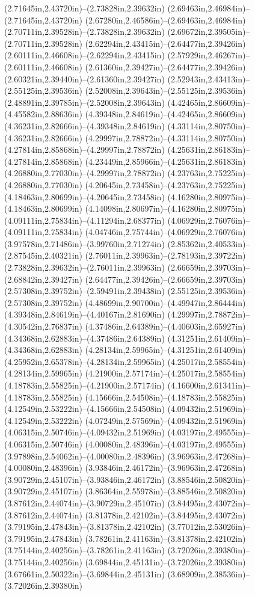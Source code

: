 (2.71645in,2.43720in)--(2.73828in,2.39632in) (2.69463in,2.46984in)--(2.71645in,2.43720in) (2.67280in,2.46586in)--(2.69463in,2.46984in) (2.70711in,2.39528in)--(2.73828in,2.39632in) (2.69672in,2.39505in)--(2.70711in,2.39528in) (2.62294in,2.43415in)--(2.64477in,2.39426in) (2.60111in,2.46608in)--(2.62294in,2.43415in) (2.57929in,2.46267in)--(2.60111in,2.46608in) (2.61360in,2.39427in)--(2.64477in,2.39426in) (2.60321in,2.39440in)--(2.61360in,2.39427in) (2.52943in,2.43413in)--(2.55125in,2.39536in) (2.52008in,2.39643in)--(2.55125in,2.39536in) (2.48891in,2.39785in)--(2.52008in,2.39643in) (4.42465in,2.86609in)--(4.45582in,2.88636in) (4.39348in,2.84619in)--(4.42465in,2.86609in) (4.36231in,2.82666in)--(4.39348in,2.84619in) (4.33114in,2.80750in)--(4.36231in,2.82666in) (4.29997in,2.78872in)--(4.33114in,2.80750in) (4.27814in,2.85868in)--(4.29997in,2.78872in) (4.25631in,2.86183in)--(4.27814in,2.85868in) (4.23449in,2.85966in)--(4.25631in,2.86183in) (4.26880in,2.77030in)--(4.29997in,2.78872in) (4.23763in,2.75225in)--(4.26880in,2.77030in) (4.20645in,2.73458in)--(4.23763in,2.75225in) (4.18463in,2.80699in)--(4.20645in,2.73458in) (4.16280in,2.80975in)--(4.18463in,2.80699in) (4.14098in,2.80697in)--(4.16280in,2.80975in) (4.09111in,2.75834in)--(4.11294in,2.68377in) (4.06929in,2.76076in)--(4.09111in,2.75834in) (4.04746in,2.75744in)--(4.06929in,2.76076in) (3.97578in,2.71486in)--(3.99760in,2.71274in) (2.85362in,2.40533in)--(2.87545in,2.40321in) (2.76011in,2.39963in)--(2.78193in,2.39722in) (2.73828in,2.39632in)--(2.76011in,2.39963in) (2.66659in,2.39703in)--(2.68842in,2.39427in) (2.64477in,2.39426in)--(2.66659in,2.39703in) (2.57308in,2.39752in)--(2.59491in,2.39438in) (2.55125in,2.39536in)--(2.57308in,2.39752in) (4.48699in,2.90700in)--(4.49947in,2.86444in) (4.39348in,2.84619in)--(4.40167in,2.81690in) (4.29997in,2.78872in)--(4.30542in,2.76837in) (4.37486in,2.64389in)--(4.40603in,2.65927in) (4.34368in,2.62883in)--(4.37486in,2.64389in) (4.31251in,2.61409in)--(4.34368in,2.62883in) (4.28134in,2.59965in)--(4.31251in,2.61409in) (4.25952in,2.65378in)--(4.28134in,2.59965in) (4.25017in,2.58554in)--(4.28134in,2.59965in) (4.21900in,2.57174in)--(4.25017in,2.58554in) (4.18783in,2.55825in)--(4.21900in,2.57174in) (4.16600in,2.61341in)--(4.18783in,2.55825in) (4.15666in,2.54508in)--(4.18783in,2.55825in) (4.12549in,2.53222in)--(4.15666in,2.54508in) (4.09432in,2.51969in)--(4.12549in,2.53222in) (4.07249in,2.57569in)--(4.09432in,2.51969in) (4.06315in,2.50746in)--(4.09432in,2.51969in) (4.03197in,2.49555in)--(4.06315in,2.50746in) (4.00080in,2.48396in)--(4.03197in,2.49555in) (3.97898in,2.54062in)--(4.00080in,2.48396in) (3.96963in,2.47268in)--(4.00080in,2.48396in) (3.93846in,2.46172in)--(3.96963in,2.47268in) (3.90729in,2.45107in)--(3.93846in,2.46172in) (3.88546in,2.50820in)--(3.90729in,2.45107in) (3.86364in,2.55978in)--(3.88546in,2.50820in) (3.87612in,2.44074in)--(3.90729in,2.45107in) (3.84495in,2.43072in)--(3.87612in,2.44074in) (3.81378in,2.42102in)--(3.84495in,2.43072in) (3.79195in,2.47843in)--(3.81378in,2.42102in) (3.77012in,2.53026in)--(3.79195in,2.47843in) (3.78261in,2.41163in)--(3.81378in,2.42102in) (3.75144in,2.40256in)--(3.78261in,2.41163in) (3.72026in,2.39380in)--(3.75144in,2.40256in) (3.69844in,2.45131in)--(3.72026in,2.39380in) (3.67661in,2.50322in)--(3.69844in,2.45131in) (3.68909in,2.38536in)--(3.72026in,2.39380in) 